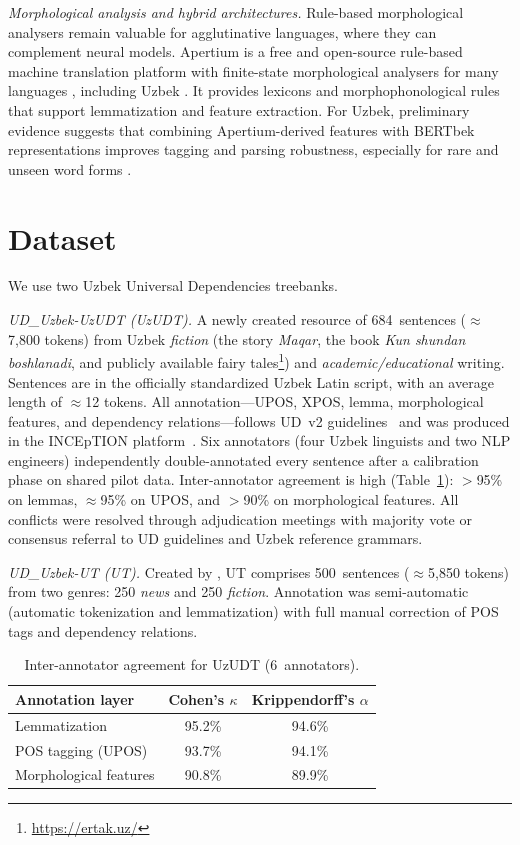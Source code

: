 \documentclass[runningheads]{llncs}
\begin{document}
\noindent\textit{Morphological analysis and hybrid architectures.}
Rule-based morphological analysers remain valuable for agglutinative languages, where they can complement neural models. Apertium is a free and open-source rule-based machine translation platform \cite{10.1007/978-3-031-05328-3_6} with finite-state morphological analysers for many languages \cite{Forcada2011}, including Uzbek \cite{Salaev2024,2301.12711,MURZINTCEV2026100195}. It provides lexicons and morphophonological rules that support lemmatization and feature extraction. For Uzbek, preliminary evidence suggests that combining Apertium-derived features with BERTbek representations improves tagging and parsing robustness, especially for rare and unseen word forms \cite{kuriyozov-etal-2024-bertbek}.
\section{Dataset}
\label{sec:dataset}
We use two Uzbek Universal Dependencies treebanks.

\textit{UD\_Uzbek-UzUDT (UzUDT).}
A newly created resource of 684~sentences (${\approx}$7{,}800 tokens) from Uzbek \emph{fiction} (the story \textit{Maqar}, the book \textit{Kun shundan boshlanadi}, and publicly available fairy tales\footnote{\url{https://ertak.uz/}}) and \emph{academic/educational} writing.
Sentences are in the officially standardized Uzbek Latin script, with an average length of ${\approx}$12 tokens.
All annotation---UPOS, XPOS, lemma, morphological features, and dependency relations---follows UD~v2 guidelines~\cite{de-marneffe-etal-2021-universal} and was produced in the INCEpTION platform~\cite{klie-etal-2018-inception}.
Six annotators (four Uzbek linguists and two NLP engineers) independently double-annotated every sentence after a calibration phase on shared pilot data.
Inter-annotator agreement is high (Table~\ref{tab:inter-annotator}): $>$95\% on lemmas, ${\approx}$95\% on UPOS, and $>$90\% on morphological features.
All conflicts were resolved through adjudication meetings with majority vote or consensus referral to UD guidelines and Uzbek reference grammars.

\textit{UD\_Uzbek-UT (UT).}
Created by \cite{akhundjanova-talamo-2025-universal}, UT comprises 500~sentences (${\approx}$5{,}850 tokens) from two genres: 250 \emph{news} and 250 \emph{fiction}.
Annotation was semi-automatic (automatic tokenization and lemmatization) with full manual correction of POS tags and dependency relations.

\begin{table}[t]
\centering
\small
\caption{Inter-annotator agreement for UzUDT (6~annotators).}
\label{tab:inter-annotator}
\begin{tabular}{lcc}
\toprule
\textbf{Annotation layer} & \textbf{Cohen's $\kappa$} & \textbf{Krippendorff's $\alpha$} \\
\midrule
Lemmatization          & 95.2\% & 94.6\% \\
POS tagging (UPOS)     & 93.7\% & 94.1\% \\
Morphological features & 90.8\% & 89.9\% \\
\bottomrule
\end{tabular}
\end{table}
\end{document}
